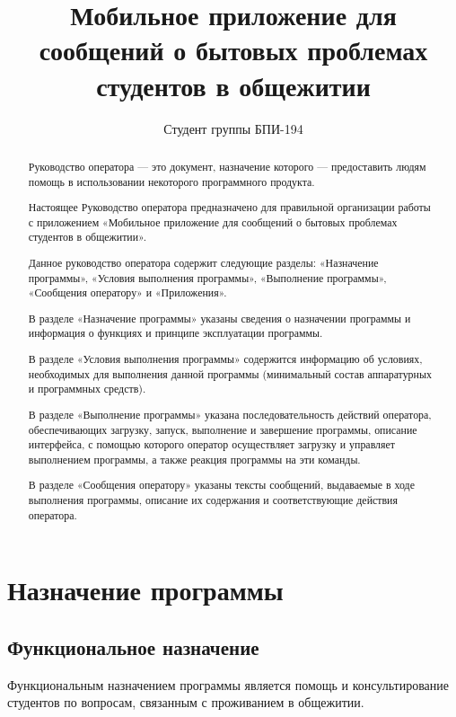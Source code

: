 \documentclass{../includes/TechDoc}
\title{Мобильное приложение для сообщений о бытовых проблемах студентов в общежитии}
\author{Студент группы БПИ-194}{В. А. Анненков}
\begin{document}
    \maketitle

    \begin{abstract}
        Руководство оператора — это документ, назначение которого — предоставить людям помощь в использовании некоторого программного продукта.

        Настоящее Руководство оператора предназначено для правильной организации работы с приложением «Мобильное приложение для сообщений о бытовых проблемах студентов в общежитии».

        Данное руководство оператора содержит следующие разделы: «Назначение программы», «Условия выполнения программы», «Выполнение программы», «Сообщения оператору» и «Приложения».

        В разделе «Назначение программы» указаны сведения о назначении программы и информация о функциях и принципе эксплуатации программы.

        В разделе «Условия выполнения программы» содержится информацию об условиях, необходимых для выполнения данной программы (минимальный состав аппаратурных и программных средств).

        В разделе «Выполнение программы» указана последовательность действий оператора, обеспечивающих загрузку, запуск, выполнение и завершение программы, описание интерфейса, с помощью которого оператор осуществляет загрузку и управляет выполнением программы, а также реакция программы на эти команды.

        В разделе «Сообщения оператору» указаны тексты сообщений, выдаваемые в ходе выполнения программы, описание их содержания и соответствующие действия оператора.
    \end{abstract}

    \newpage

    \tableofcontents


    \section{Назначение программы}

    \subsection{Функциональное назначение}

    Функциональным назначением программы является помощь и консультирование студентов по вопросам, связанным
    с проживанием в общежитии.
\end{document}
